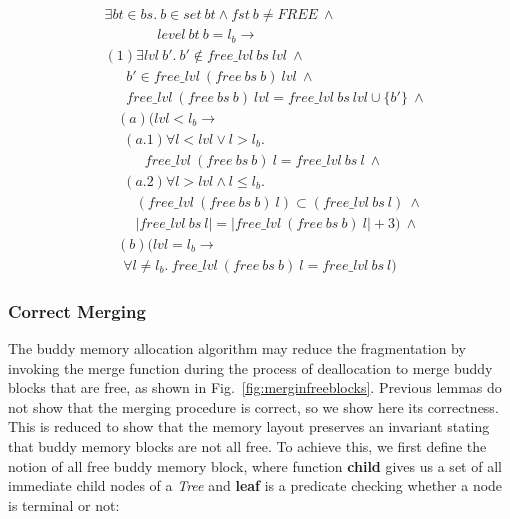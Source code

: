 \begin{lemma} 
\label{lemma:free_deallocation}
\end{lemma}
\begin{align*}
&\exists bt \in bs.\ b \in set\ bt \wedge fst\ b \neq FREE\ \wedge\\
&\ \ \ \ \ \ \ \ \ \ \ \ \ \ \ \ \ level\ bt\ b = l_b \longrightarrow\\
&(1)\exists lvl\ b'.\ b' \notin free\_lvl\ bs\ lvl\ \wedge  \\
&\ \ \ \ \ \ \ b' \in free\_lvl\ (free\ bs\ b)\ lvl\ \wedge\\
&\ \ \ \ \ \ \ free\_lvl\ (free\ bs\ b)\ lvl = free\_lvl\ bs\ lvl \cup \lbrace b' \rbrace\ \wedge \\
& \ \ \ \ (a)(lvl < l_b \longrightarrow\\
&\ \ \ \ \ \ (a.1)\forall l < lvl \vee l > l_b.\ \\ 
&\ \ \ \ \ \ \ \ \ \ \ \ \ free\_lvl\ (free\ bs\ b)\ l = free\_lvl\ bs\ l\ \wedge\\
&\ \ \ \ \ \ (a.2)\forall l > lvl \wedge l \le l_b. \\
&\ \ \ \ \ \ \ \ \ \ (free\_lvl\ (free\ bs\ b)\ l) \subset (free\_lvl\ bs\ l)\ \wedge\\
&\ \ \ \ \ \ \ \ \ \ |free\_lvl\ bs\ l| = |free\_lvl\ (free\ bs\ b)\ l| + 3)\ \wedge\\
& \ \ \ \ (b)(lvl = l_b \longrightarrow \\
&\ \ \ \ \ \ \forall l \ne l_b.\ free\_lvl\ (free\ bs\ b)\ l = free\_lvl\ bs\ l)
\end{align*}


\subsubsection{Correct Merging}
The buddy memory allocation algorithm may reduce the fragmentation by invoking the merge function during the process of deallocation to merge buddy blocks that are free, as shown in Fig.~\ref{fig:merginfreeblocks}. Previous lemmas do not show that the merging procedure is correct, so we show here its correctness. This is reduced to show that the memory layout preserves an invariant stating that buddy memory blocks are not all free. To achieve this, we first define the notion of all free buddy memory block, where function \textbf{child} gives us a set of all immediate child nodes of a \emph{Tree} and \textbf{leaf} is a predicate checking whether a node is terminal or not:

